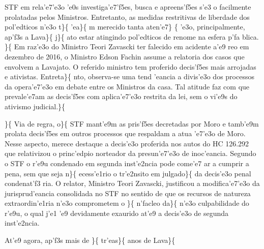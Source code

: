 STF em rela'e7'e3o 'e0s investiga'e7'f5es, busca e apreens'f5es s'e3 o
facilmente prolatadas pelos Ministros. Entretanto, as medidas
restritivas de liberdade dos pol'edticos n'e3o t\}\{\rtlch{} 
\ltrch{}  'ea\}\{\rtlch{}  \ltrch{}
 m merecido tanta aten'e7\}
\{\rtlch{}  \ltrch{}  'e3o, principalmente,
ap'f3s a Lava\}\{\rtlch{}  \ltrch{} 
j\}\{\rtlch{}  \ltrch{}  ato
estar atingindo pol'edticos de renome na esfera p'fa blica.
\}\{\rtlch{}  \ltrch{}  Em raz'e3o do Ministro
Teori Zavascki ter falecido em acidente a'e9 reo em dezembro de 2016, o
Ministro Edson Fachin assume a relatoria dos casos que envolvem a
Lavajato. O referido ministro tem proferido decis'f5es mais arrojadas e
ativistas. Entreta\}\{\rtlch{}  \ltrch{}  nto,
observa-se uma tend 'eancia a divis'e3o dos processos da opera'e7'e3o em
debate entre os Ministros da casa. Tal atitude faz com que prevale'e7am
as decis'f5es com aplica'e7'e3o restrita da lei, sem o vi'e9s do
ativismo judicial.\}\{\rtlch{}  \ltrch{}
 \par \tab \}\{\rtlch{} 
\ltrch{}  Via de regra, o\}\{\rtlch{} 
\ltrch{}  STF mant'e9m as pris'f5es
decretadas por Moro e tamb'e9m prolata decis'f5es em outros processos
que respaldam a atua 'e7'e3o de Moro. Nesse aspecto, merece destaque a
decis'e3o proferida nos autos do HC 126.292 que relativizou o
princ'edpio norteador da presun'e7'e3o de inoc'eancia. Segundo o STF o
r'e9u condenado em segunda inst'e2ncia pode come'e7 ar a cumprir a pena,
sem que seja n\}\{\rtlch{}  \ltrch{} 
ecess'e1rio o tr'e2nsito em julgado\}\{\rtlch{}  \ltrch{}
 da decis'e3o penal condenat'f3 ria. O
relator, Ministro Teori Zavascki, justificou a modifica'e7'e3o da
jurisprud'eancia consolidada no STF no sentido de que os recursos de
natureza extraordin'e1ria n'e3o comprometem o \}\{\rtlch{} 
\ltrch{}  n'facleo da\}\{\rtlch{}
 \ltrch{}  n'e3o culpabilidade do
r'e9u, o qual j'e1 'e9 devidamente exaurido at'e9 a decis'e3o de segunda
inst'e2ncia. \par \tab At'e9 agora, ap'f3s mais de \}\{\rtlch{} 
\ltrch{}  tr'eas\}\{\rtlch{}  \ltrch{}
 anos de Lava\}\{\rtlch{} 
